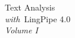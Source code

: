 \clearpage
\pagestyle{empty}
\cleardoublepage
\vspace*{1.75in}
\begin{center}
{\hfill \Huge Text Analysis \\[4pt] \hfill {\LARGE\it with}\ LingPipe 4.0 \\[18pt] \hfill {\large\it Volume I}}
\end{center}
